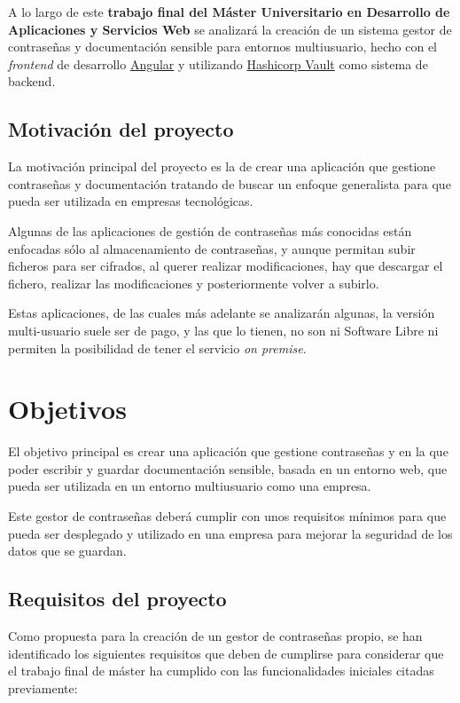 \documentclass{\ClassPath/viu-tfm-template}
\begin{document}
A lo largo de este \textbf{trabajo final del Máster Universitario en Desarrollo de Aplicaciones y Servicios Web} se analizará la creación de un sistema gestor de contraseñas y documentación sensible para entornos multiusuario, hecho con el \textit{frontend} de desarrollo \href{https://angular.io/}{Angular} y utilizando  \href{https://www.vaultproject.io/}{Hashicorp Vault} como sistema de backend.

\section{Motivación del proyecto}

La motivación principal del proyecto es la de crear una aplicación que gestione contraseñas y documentación tratando de buscar un enfoque generalista para que pueda ser utilizada en empresas tecnológicas.

Algunas de las aplicaciones de gestión de contraseñas más conocidas están enfocadas sólo al almacenamiento de contraseñas, y aunque permitan subir ficheros para ser cifrados, al querer realizar modificaciones, hay que descargar el fichero, realizar las modificaciones y posteriormente volver a subirlo.

Estas aplicaciones, de las cuales más adelante se analizarán algunas, la versión multi-usuario suele ser de pago, y las que lo tienen, no son ni Software Libre ni permiten la posibilidad de tener el servicio \textit{on premise}.



\chapter{Objetivos}

El objetivo principal es crear una aplicación que gestione contraseñas y en la que poder escribir y guardar documentación sensible, basada en un entorno web, que pueda ser utilizada en un entorno multiusuario como una empresa.

Este gestor de contraseñas deberá cumplir con unos requisitos mínimos para que pueda ser desplegado y utilizado en una empresa para mejorar la seguridad de los datos que se guardan.


\section{Requisitos del proyecto}
Como propuesta para la creación de un gestor de contraseñas propio, se han identificado los siguientes requisitos que deben de cumplirse para considerar que el trabajo final de máster ha cumplido con las funcionalidades iniciales citadas previamente:
\end{document}
